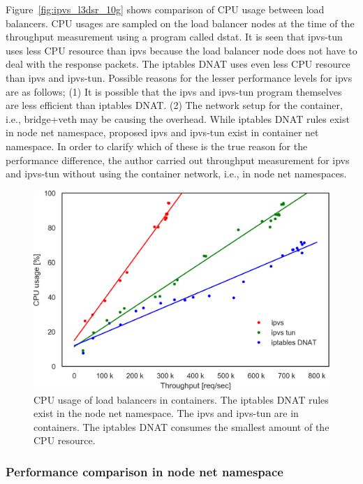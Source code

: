 Figure~\ref{fig:ipvs_l3dsr_10g} shows comparison of CPU usage between load balancers.
CPU usages are sampled on the load balancer nodes at the time of the throughput measurement using a program called dstat\cite{wieers2019dstat}.
It is seen that ipvs-tun uses less CPU resource than ipvs because the load balancer node does not have to deal with the response packets.
The iptables DNAT uses even less CPU resource than ipvs and ipvs-tun.
Possible reasons for the lesser performance levels for ipvs are as follows;
(1) It is possible that the ipvs and ipvs-tun program themselves are less efficient than iptables DNAT.
(2) The network setup for the container, i.e., bridge+veth may be causing the overhead.
While iptables DNAT rules exist in node net namespace, proposed ipvs and ipvs-tun exist in container net namespace.
In order to clarify which of these is the true reason for the performance difference, the author carried out throughput measurement for ipvs and ipvs-tun without using the container network, i.e., in node net namespaces.

\begin{figure}[h]
  \centering
  \includegraphics[width=0.8\columnwidth]{Figs/cpu_usage_10g}
  \par\bigskip
  \centering
  \begin{minipage}{0.9\columnwidth}
    \caption[CPU usage of load balancers in containers]{
      CPU usage of load balancers in containers.
      The iptables DNAT rules exist in the node net namespace.
      The ipvs and ipvs-tun are in containers.
      The iptables DNAT consumes the smallest amount of the CPU resource.
    }
    \label{fig:cpu_usage_10g}
  \end{minipage}
\end{figure}

\FloatBarrier

\subsubsection{Performance comparison in node net namespace}


